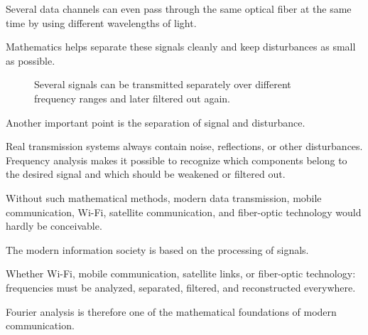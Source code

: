Several data channels can even pass through the same optical fiber at the same time
by using different wavelengths of light.

Mathematics helps separate these signals cleanly
and keep disturbances as small as possible.

\FloatBarrier
\begin{figure}[h]
	\centering
	\caption{
		Several signals can be transmitted separately over different frequency ranges
		and later filtered out again.
	}
	\label{fig:frequenzkanaele}
\end{figure}

Another important point is the separation of signal and disturbance.

Real transmission systems always contain noise,
reflections,
or other disturbances.
Frequency analysis makes it possible to recognize
which components belong to the desired signal
and which should be weakened or filtered out.

Without such mathematical methods,
modern data transmission,
mobile communication,
Wi-Fi,
satellite communication,
and fiber-optic technology would hardly be conceivable.

\begin{NoteBox}
	\small
	\label{box:fourier-digitale-welt}
	The modern information society is based on the processing of signals.
	
	Whether Wi-Fi,
	mobile communication,
	satellite links,
	or fiber-optic technology:
	frequencies must be analyzed,
	separated,
	filtered,
	and reconstructed everywhere.
	
	Fourier analysis is therefore one of the mathematical foundations
	of modern communication.
\end{NoteBox}

